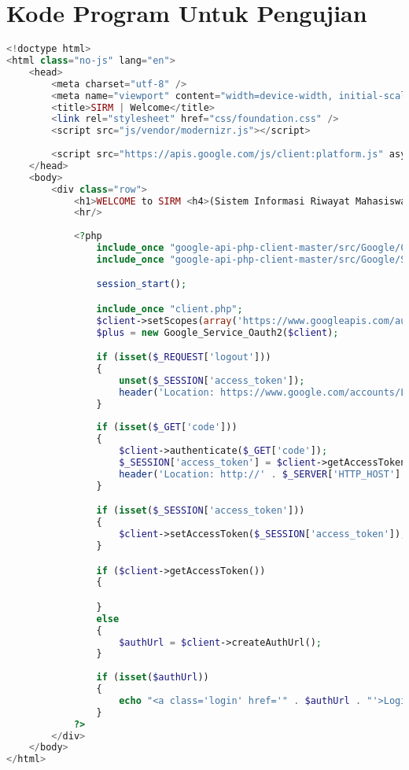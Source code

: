 \chapter{Kode Program Untuk Pengujian}
\label{kode_program_pengujian}

\singlespacing 
%
%
\begin{lstlisting}[language=php,basicstyle=\tiny,caption=index.php]
<!doctype html>
<html class="no-js" lang="en">
	<head>
		<meta charset="utf-8" />
		<meta name="viewport" content="width=device-width, initial-scale=1.0" />
		<title>SIRM | Welcome</title>
		<link rel="stylesheet" href="css/foundation.css" />
		<script src="js/vendor/modernizr.js"></script>
		
		<script src="https://apis.google.com/js/client:platform.js" async defer></script>
	</head>
	<body>
		<div class="row">
			<h1>WELCOME to SIRM <h4>(Sistem Informasi Riwayat Mahasiswa)</h4></h1>
			<hr/>
			
			<?php
				include_once "google-api-php-client-master/src/Google/Client.php";
				include_once "google-api-php-client-master/src/Google/Service/Oauth2.php";

				session_start();

				include_once "client.php";
				$client->setScopes(array('https://www.googleapis.com/auth/plus.login','email'));
				$plus = new Google_Service_Oauth2($client);

				if (isset($_REQUEST['logout']))
				{
					unset($_SESSION['access_token']);
					header('Location: https://www.google.com/accounts/Logout?continue=https://appengine.google.com/_ah/logout?continue=http://' . $_SERVER['HTTP_HOST'] . $_SERVER['PHP_SELF']);
				}
			
				if (isset($_GET['code']))
				{
					$client->authenticate($_GET['code']);
					$_SESSION['access_token'] = $client->getAccessToken();
					header('Location: http://' . $_SERVER['HTTP_HOST'] . $_SERVER['PHP_SELF']);
				}

				if (isset($_SESSION['access_token']))
				{
					$client->setAccessToken($_SESSION['access_token']);
				}

				if ($client->getAccessToken()) 
				{

				}
				else
				{
					$authUrl = $client->createAuthUrl();
				}
				
				if (isset($authUrl))
				{
					echo "<a class='login' href='" . $authUrl . "'>Login with Google</a>";
				}
			?>
		</div>
	</body>
</html>
\end{lstlisting}


